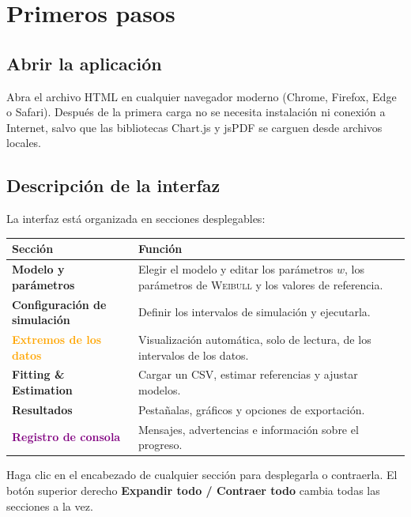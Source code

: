 \documentclass[11pt,a4paper]{article}
\newcommand{\Weibull}{\textsc{Weibull}}
\begin{document}
\section{Primeros pasos}

\subsection{Abrir la aplicación}

Abra el archivo HTML en cualquier navegador moderno (Chrome, Firefox, Edge o Safari). Después de la primera carga no se necesita instalación ni conexión a Internet, salvo que las bibliotecas Chart.js y jsPDF se carguen desde archivos locales.

\subsection{Descripción de la interfaz}

La interfaz está organizada en secciones desplegables:

\begin{center}
\begin{tabularx}{\textwidth}{lX}
\toprule
\textbf{Sección} & \textbf{Función} \\
\midrule
\textcolor{bluehl}{\textbf{Modelo y parámetros}} & Elegir el modelo y editar los parámetros $w$, los parámetros de \Weibull{} y los valores de referencia. \\
\textcolor{greenhl}{\textbf{Configuración de simulación}} & Definir los intervalos de simulación y ejecutarla. \\
\textcolor{orange}{\textbf{Extremos de los datos}} & Visualización automática, solo de lectura, de los intervalos de los datos. \\
\textcolor{redhl}{\textbf{Fitting \& Estimation}} & Cargar un CSV, estimar referencias y ajustar modelos. \\
\textcolor{accent}{\textbf{Resultados}} & Pestañalas, gráficos y opciones de exportación. \\
\textcolor{purple}{\textbf{Registro de consola}} & Mensajes, advertencias e información sobre el progreso. \\
\bottomrule
\end{tabularx}
\end{center}

Haga clic en el encabezado de cualquier sección para desplegarla o contraerla. El botón superior derecho \textbf{Expandir todo / Contraer todo} cambia todas las secciones a la vez.
\end{document}
